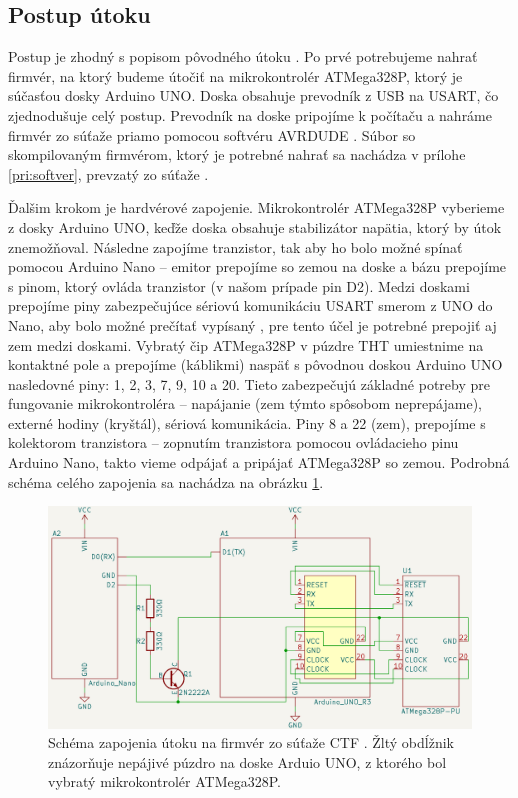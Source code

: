 \subsection{Postup útoku}
Postup je zhodný s popisom pôvodného útoku \cite{vccOnTheCheap}. Po prvé potrebujeme nahrať firmvér, na ktorý budeme útočiť na mikrokontrolér ATMega328P, ktorý je súčasťou dosky Arduino UNO. Doska obsahuje prevodník z USB na USART, čo zjednodušuje celý postup. Prevodník na doske pripojíme k počítaču a nahráme firmvér zo súťaže priamo pomocou softvéru AVRDUDE \cite{vccOnTheCheap}. Súbor  so skompilovaným firmvérom, ktorý je potrebné nahrať sa nachádza v prílohe \ref{pri:softver}, prevzatý zo súťaže \cite{vccOnTheCheap}. 

Ďalšim krokom je hardvérové zapojenie. Mikrokontrolér ATMega328P vyberieme z dosky Arduino UNO, keďže doska obsahuje stabilizátor napätia, ktorý by útok znemožňoval. Následne zapojíme tranzistor, tak aby ho bolo možné spínať pomocou Arduino Nano -- emitor prepojíme so zemou na doske a bázu prepojíme s pinom, ktorý ovláda tranzistor (v našom prípade pin D2). Medzi doskami prepojíme piny zabezpečujúce sériovú komunikáciu USART smerom z UNO do Nano, aby bolo možné prečítať vypísaný , pre tento účel je potrebné prepojiť aj zem medzi doskami. Vybratý čip ATMega328P v púzdre THT umiestnime na kontaktné pole a prepojíme (káblikmi) naspäť s pôvodnou doskou Arduino UNO nasledovné piny: 1, 2, 3, 7, 9, 10 a 20. Tieto zabezpečujú základné potreby pre fungovanie mikrokontroléra -- napájanie (zem týmto spôsobom neprepájame), externé hodiny (kryštál), sériová komunikácia. Piny 8 a 22 (zem), prepojíme s kolektorom tranzistora -- zopnutím tranzistora pomocou ovládacieho pinu Arduino Nano, takto vieme odpájať a pripájať ATMega328P so zemou. Podrobná schéma celého zapojenia sa nachádza na obrázku \ref{obr:schemeCTF}.

\begin{figure}
    \centerline{\includegraphics[width=1\textwidth]{images/schemeCTF.png}}
    \caption[Schéma zapojenia útoku na firmvér zo súťaže CTF]{Schéma zapojenia útoku na firmvér zo súťaže CTF \cite{vccOnTheCheap}. Žltý obdĺžnik znázorňuje nepájivé púzdro na doske Arduio UNO, z ktorého bol vybratý mikrokontrolér ATMega328P.}
    \label{obr:schemeCTF}
\end{figure}

